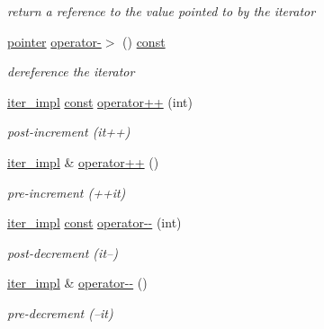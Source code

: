\begin{DoxyCompactItemize}
\begin{DoxyCompactList}\small\item\em return a reference to the value pointed to by the iterator \end{DoxyCompactList}\item 
\hyperlink{classnlohmann_1_1detail_1_1iter__impl_a69e52f890ce8c556fd68ce109e24b360}{pointer} \hyperlink{classnlohmann_1_1detail_1_1iter__impl_a28a0c92903edd8f86825c8c7784b0913}{operator-\/$>$} () \hyperlink{functions__c_8js_afacfd9c985d225bb07483b887a801b6f}{const} 
\begin{DoxyCompactList}\small\item\em dereference the iterator \end{DoxyCompactList}\item 
\hyperlink{classnlohmann_1_1detail_1_1iter__impl}{iter\+\_\+impl} \hyperlink{functions__c_8js_afacfd9c985d225bb07483b887a801b6f}{const} \hyperlink{classnlohmann_1_1detail_1_1iter__impl_a7d2397773b2dce42f30f0375a6a1d850}{operator++} (int)
\begin{DoxyCompactList}\small\item\em post-\/increment (it++) \end{DoxyCompactList}\item 
\hyperlink{classnlohmann_1_1detail_1_1iter__impl}{iter\+\_\+impl} \& \hyperlink{classnlohmann_1_1detail_1_1iter__impl_abdfe2a7f464400a7ab572782d14b922f}{operator++} ()
\begin{DoxyCompactList}\small\item\em pre-\/increment (++it) \end{DoxyCompactList}\item 
\hyperlink{classnlohmann_1_1detail_1_1iter__impl}{iter\+\_\+impl} \hyperlink{functions__c_8js_afacfd9c985d225bb07483b887a801b6f}{const} \hyperlink{classnlohmann_1_1detail_1_1iter__impl_a1fc43e764467b8ea4a4cdd01f629d757}{operator-\/-\/} (int)
\begin{DoxyCompactList}\small\item\em post-\/decrement (it--) \end{DoxyCompactList}\item 
\hyperlink{classnlohmann_1_1detail_1_1iter__impl}{iter\+\_\+impl} \& \hyperlink{classnlohmann_1_1detail_1_1iter__impl_a84e689fb581d651d130039f7cb81494a}{operator-\/-\/} ()
\begin{DoxyCompactList}\small\item\em pre-\/decrement (--it) \end{DoxyCompactList}\item 

\end{DoxyCompactItemize}
